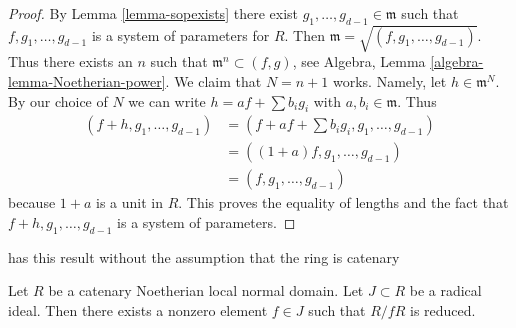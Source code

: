 \begin{proof}
By Lemma \ref{lemma-sopexists} there exist
$g_1, \ldots, g_{d - 1} \in \mathfrak m$
such that $f, g_1, \ldots, g_{d - 1}$ is a system of parameters for $R$.
Then $\mathfrak m = \sqrt{(f, g_1, \ldots, g_{d - 1})}$.
Thus there exists an $n$ such that $\mathfrak m^n \subset (f, g)$, see
Algebra, Lemma \ref{algebra-lemma-Noetherian-power}. We claim that
$N = n + 1$ works.
Namely, let $h \in \mathfrak m^N$. By our choice of $N$ we can write
$h = af + \sum b_ig_i$ with $a, b_i \in \mathfrak m$. Thus
\begin{align*}
(f + h, g_1, \ldots, g_{d - 1})
& =
(f + af + \sum b_ig_i, g_1, \ldots, g_{d - 1}) \\
& =
((1 + a)f, g_1, \ldots, g_{d - 1}) \\
& =
(f, g_1, \ldots, g_{d - 1})
\end{align*}
because $1 + a$ is a unit in $R$. This proves the equality
of lengths and the fact that $f + h, g_1, \ldots, g_{d - 1}$
is a system of parameters.
\end{proof}

\begin{proposition}
\label{proposition-propdimd}
\begin{reference}
\cite[Lemma 3.14]{Artin-Lipman} has this result without the
assumption that the ring is catenary
\end{reference}
Let $R$ be a catenary Noetherian local normal domain.
Let $J \subset R$ be a radical ideal.
Then there exists a nonzero element $f \in J$
such that $R/fR$ is reduced.
\end{proposition}

